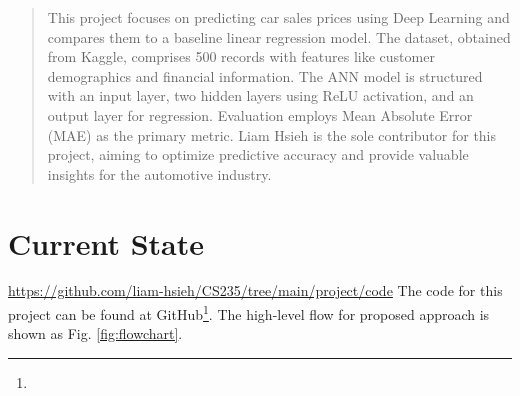 \documentclass[manuscript,screen,review,nonacm]{acmart}
\begin{document}
\begin{abstract}
This project focuses on predicting car sales prices using Deep Learning and compares them to a baseline linear regression model. The dataset, obtained from Kaggle, comprises 500 records with features like customer demographics and financial information. The ANN model is structured with an input layer, two hidden layers using ReLU activation, and an output layer for regression. Evaluation employs Mean Absolute Error (MAE) as the primary metric. Liam Hsieh is the sole contributor for this project, aiming to optimize predictive accuracy and provide valuable insights for the automotive industry.
\end{abstract}



\maketitle

\section{Current State}
\urldef{\repourl}\url{https://github.com/liam-hsieh/CS235/tree/main/project/code}
The code for this project can be found at GitHub\footnote{\repourl}.
The high-level flow for proposed approach is shown as Fig. \ref{fig:flowchart}.   
\end{document}

